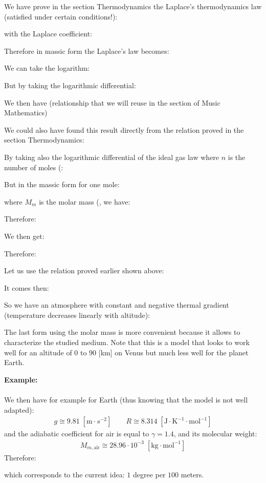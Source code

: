 	We have prove in the section Thermodynamics the Laplace's thermodynamics law (satisfied under certain conditions!):
	
	with the Laplace coefficient:
	
	Therefore in massic form the Laplace's law becomes:
	
	We can take the logarithm:
	
	But by taking the logarithmic differential:
	
	We then have (relationship that we will reuse in the section of Music Mathematics)
	
	We could also have found this result directly from the relation proved in the section Thermodynamics:
	
	By taking also the logarithmic differential  of the ideal gas law where $n$ is the number of moles (:
	
	But in the massic form for one mole:
	
	where $M_m$ is the molar mass (, we have:
		
	Therefore:
	
	We then get:
	
	Therefore:
	
	Let us use the relation proved earlier shown above:
	
	It comes then:
	
	So we have an atmosphere with constant and negative thermal gradient (temperature decreases linearly with altitude):
	
	The last form using the molar mass is more convenient because it allows to characterize the studied medium. Note that this is a model that looks to work well for an altitude of $0$ to $90$ [km] on Venus but much less well for the planet Earth.
	\begin{tcolorbox}[colframe=black,colback=white,sharp corners]
	\textbf{{\Large {}}Example:}\\\\
	We then have for example for Earth (thus knowing that the model is not well adapted):
	\begin{gather*}
		g\cong 9.81\;[\text{m}\cdot{s}^{-2}]\qquad R\cong 8.314\;[\text{J}\cdot \text{K}^{-1}\cdot \text{mol}^{-1}]
	\end{gather*}
	and the adiabatic coefficient for air is equal to $\gamma=1.4$, and its molecular weight:
	\begin{gather*}
		M_{m,\text{air}}\cong 28.96\cdot 10^{-3}\;[\text{kg}\cdot\text{mol}^{-1}]
	\end{gather*}
	Therefore:
	
	which corresponds to the current idea: $1$ degree per $100$ meters.
	\end{tcolorbox}
	
